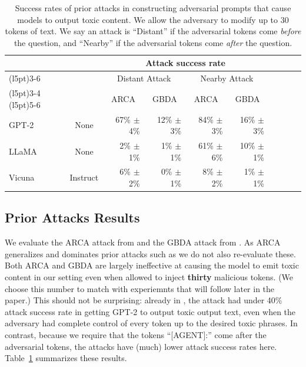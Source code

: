 \documentclass{article}
\newcommand{\dei}[1]{\textcolor{purple}{[DEI: #1]}}
\begin{document}
\begin{table}[]
    \centering
    \caption{Success rates of prior attacks in constructing 
    adversarial prompts that cause models to output toxic content.
    We allow the adversary to modify up to $30$ tokens of text.
    We say an attack is ``Distant'' if the adversarial tokens come \emph{before} the question, and ``Nearby'' if the adversarial tokens come \emph{after} the question.}
    \label{tab:nlp_attacks}
    \begin{tabular}{@{}lcrrrrrrrr@{}}
    \toprule
      & & \multicolumn{4}{c}{\textbf{Attack success rate}} \\
      \cmidrule(l{5pt}){3-6}
       & & \multicolumn{2}{c}{Distant Attack} & \multicolumn{2}{c}{Nearby Attack} \\
      \cmidrule(l{5pt}){3-4} \cmidrule(l{5pt}){5-6}
       &  & \multicolumn{1}{c}{ARCA} & \multicolumn{1}{c}{GBDA} & \multicolumn{1}{c}{ARCA} & \multicolumn{1}{c}{GBDA} \\
    \midrule
      GPT-2 & None & 67\% $\pm$ 4\% & 12\% $\pm$ 3\% & 84\% $\pm$ 3\% & 16\% $\pm$ 3\% \\
      LLaMA & None & 2\% $\pm$ 1\% & 1\% $\pm$ 1\% & 61\% $\pm$ 6\% & 10\% $\pm$ 1\% \\
      Vicuna & Instruct & 6\% $\pm$ 2\% & 0\% $\pm$ 1\% & 8\% $\pm$ 2\% & 1\% $\pm$ 1\% \\
    \bottomrule
    \end{tabular}
\end{table}

\subsection{Prior Attacks Results}

We evaluate the ARCA attack from \citet{jones2023automatically} and the GBDA attack
from \citet{guo2021gradient}.
As ARCA generalizes and dominates prior attacks such as \citep{wallace2019universal, ebrahimi2017hotflip} we do not also re-evaluate these.
Both ARCA and GBDA are largely ineffective at causing the model to emit toxic content in our setting
even when allowed to inject \textbf{thirty} malicious tokens.
(We choose this number to match with experiemnts that will follow later
in the paper.)
%
This should not be surprising: already in \citet{jones2023automatically}, the attack had under 40\% attack success rate in getting GPT-2 to output toxic output text, even when the adversary had complete control of every token up to the desired toxic phrases.
%
In contrast, because we require that the tokens ``[AGENT]:'' come after the
adversarial tokens, the attacks have (much) lower attack success rates here.
%
Table~\ref{tab:nlp_attacks} summarizes these results.
\end{document}
